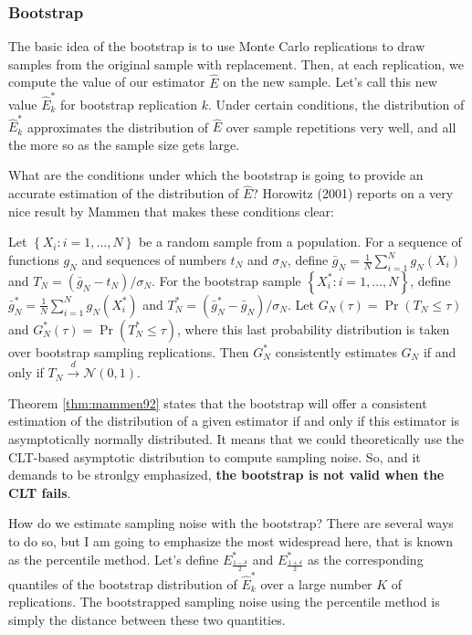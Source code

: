 \documentclass[]{book}
\theoremstyle{definition}
\theoremstyle{definition}
\theoremstyle{definition}
\theoremstyle{remark}
\let\BeginKnitrBlock\begin \let\EndKnitrBlock\end
\begin{document}
\subsubsection{Bootstrap}\label{bootstrap}

The basic idea of the bootstrap is to use Monte Carlo replications to
draw samples from the original sample with replacement. Then, at each
replication, we compute the value of our estimator \(\hat{E}\) on the
new sample. Let's call this new value \(\hat{E}^*_k\) for bootstrap
replication \(k\). Under certain conditions, the distribution of
\(\hat{E}^*_k\) approximates the distribution of \(\hat{E}\) over sample
repetitions very well, and all the more so as the sample size gets
large.

What are the conditions under which the bootstrap is going to provide an
accurate estimation of the distribution of \(\hat{E}\)? Horowitz (2001)
reports on a very nice result by Mammen that makes these conditions
clear:

\BeginKnitrBlock{theorem}[Mammen (1992)]
\protect\hypertarget{thm:mammen92}{}{\label{thm:mammen92} \iffalse (Mammen
(1992)) \fi{} }Let \(\left\{X_i:i=1,\dots,N\right\}\) be a random sample
from a population. For a sequence of functions \(g_N\) and sequences of
numbers \(t_N\) and \(\sigma_N\), define
\(\bar{g}_N=\frac{1}{N}\sum_{i=1}^Ng_N(X_i)\) and
\(T_N=(\bar{g}_N-t_N)/\sigma_N\). For the bootstrap sample
\(\left\{X^*_i:i=1,\dots,N\right\}\), define
\(\bar{g}^*_N=\frac{1}{N}\sum_{i=1}^Ng_N(X^*_i)\) and
\(T^*_N=(\bar{g}^*_N-\bar{g}_N)/\sigma_N\). Let
\(G_N(\tau)=\Pr(T_N\leq\tau)\) and \(G^*_N(\tau)=\Pr(T^*_N\leq\tau)\),
where this last probability distribution is taken over bootstrap
sampling replications. Then \(G^*_N\) consistently estimates \(G_N\) if
and only if \(T_N\stackrel{d}{\rightarrow}\mathcal{N}(0,1)\).
\EndKnitrBlock{theorem}

Theorem \ref{thm:mammen92} states that the bootstrap will offer a
consistent estimation of the distribution of a given estimator if and
only if this estimator is asymptotically normally distributed. It means
that we could theoretically use the CLT-based asymptotic distribution to
compute sampling noise. So, and it demands to be stronlgy emphasized,
\textbf{the bootstrap is not valid when the CLT fails}.

How do we estimate sampling noise with the bootstrap? There are several
ways to do so, but I am going to emphasize the most widespread here,
that is known as the percentile method. Let's define
\(E^*_{\frac{1-\delta}{2}}\) and \(E^*_{\frac{1+\delta}{2}}\) as the
corresponding quantiles of the bootstrap distribution of \(\hat{E}^*_k\)
over a large number \(K\) of replications. The bootstrapped sampling
noise using the percentile method is simply the distance between these
two quantities.
\end{document}
